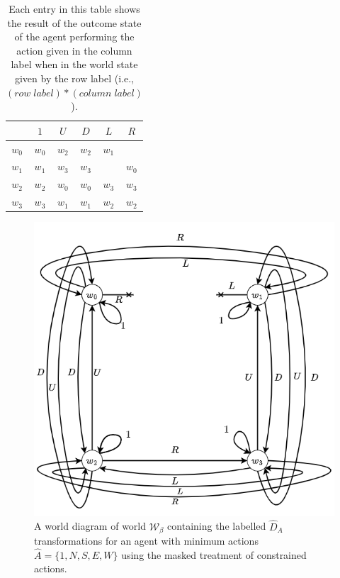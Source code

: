 \begin{table}[H]
    \centering
    \begin{tabular}{c|c c c c c}
                &  $1$      & $U$       & $D$       & $L$               & $R$\\
         \hline
        $w_{0}$ & $w_{0}$   & $w_{2}$   & $w_{2}$   & $w_{1}$           & \bm{$\bot$} \\
        $w_{1}$ & $w_{1}$   & $w_{3}$   & $w_{3}$   & \bm{$\bot$}         & $w_{0}$ \\
        $w_{2}$ & $w_{2}$   & $w_{0}$   & $w_{0}$   & $w_{3}$           & $w_{3}$ \\
        $w_{3}$ & $w_{3}$   & $w_{1}$   & $w_{1}$   & $w_{2}$           & $w_{2}$ \\
    \end{tabular}
    \caption{
    Each entry in this table shows the result of the outcome state of the agent performing the action given in the column label when in the world state given by the row label (i.e., $(row \; label) * (column \; label)$).
    }
    \label{tab:2x2_gridworld_minimum_transformations_wall_masked}
\end{table}

\begin{figure}[H]
    \centering
    \includegraphics[width=0.75\linewidth]{5BeyondSBDRL/GlobalAlgebras/Images/masked_walls_2x2_cyclical_min_actions.drawio.png}
    \caption{
    A world diagram of world $\mathscr{W}_{\beta}$ containing the labelled $\hat{D}_{A}$ transformations for an agent with minimum actions $\hat{A} = \{1, N, S, E, W\}$ using the masked treatment of constrained actions.
    }
    \label{fig:2x2_gridworld_minimum_transformations_wall_masked}
\end{figure}

